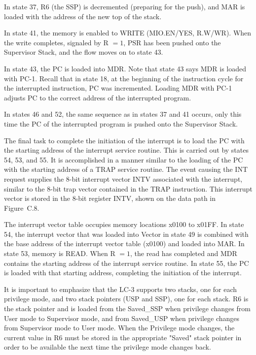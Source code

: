 \documentclass{patt}
\begin{document}
In state 37, R6 (the SSP) is decremented (preparing for the push), and MAR
is loaded with the address of the new top of the stack.

In state 41, the memory is enabled to WRITE (MIO.EN/YES, R.W/WR).
When the write completes, signaled by R $=1$, PSR has been pushed onto
the Supervisor Stack, and the flow moves on to state 43.

In state 43, the PC is loaded into MDR.  Note that state 43 says MDR
is loaded with PC-1.  Recall that in state 18, at the beginning of the
instruction cycle for the interrupted instruction, PC was incremented.
Loading MDR with PC-1 adjusts PC to the correct address of the
interrupted program.

In states 46 and 52, the same sequence as in states 37 and 41 occurs,
only this time the PC of the interrupted program is pushed onto the
Supervisor Stack.

The final task to complete the initiation of the interrupt is to load
the PC with the starting address of the interrupt service routine.
This is carried out by states 54, 53, and 55.  It is accomplished in a
manner similar to the loading of the PC with the starting address of a
TRAP service routine.  The event causing the INT request supplies the
8-bit interrupt vector INTV associated with the interrupt, similar
to the 8-bit trap vector contained in the TRAP instruction.  This
interrupt vector is stored in the 8-bit register INTV, shown on
the data path in Figure~C.8.

The interrupt vector table occupies memory locations x0100 to x01FF.
In state 54, the interrupt vector that was loaded into Vector in
state 49 is combined with the base address of the interrupt vector table
(x0100) and loaded into MAR.  In state 53, memory is READ.
When R $=1$, the read has completed and MDR contains the starting
address of the interrupt service routine.  In state 55, the PC is
loaded with that starting address, completing the initiation of the
interrupt.

It is important to emphasize that the LC-3 supports two stacks, one
for each privilege mode, and two stack pointers (USP and SSP), one for
each stack.  R6 is the stack pointer and is loaded from the
Saved\_SSP when privilege changes from User mode to Supervisor mode,
and from Saved\_USP when privilege changes from Supervisor mode to
User mode.  When the Privilege mode changes, the
current value in R6 must be stored in the appropriate "Saved" stack
pointer in order to be available the next time the privilege mode
changes back.
\end{document}
